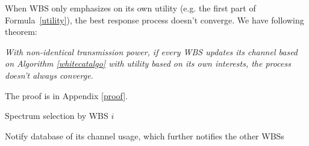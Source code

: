 When WBS only emphasizes on its own utility (e.g. the first part of Formula~\ref{utility}), the best response process doesn't converge.
We have following theorem:
\begin{theorem}
\label{noconvergence}
\emph{With non-identical transmission power, if every WBS updates its channel based on Algorithm \ref{whitecatalgo} with utility based on its own interests, the process doesn't always converge.}
\end{theorem}
The proof is in Appendix \ref{proof}.


\begin{algorithm}[h]
\caption{Spectrum selection by WBS $i$}          %
\label{whitecatalgo} 
\DontPrintSemicolon
\SetAlgoLined
{}

	
Notify database of its channel usage, which further notifies the other WBSs

\end{algorithm}





